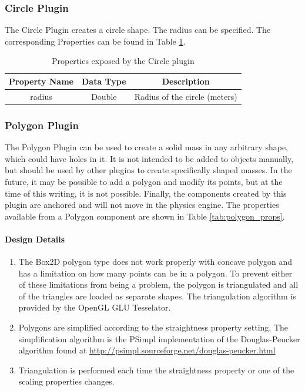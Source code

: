 \begin{itemize}
\subsubsection*{Circle Plugin}
The Circle Plugin creates a circle shape. The radius
can be specified. The corresponding Properties can be found in Table \ref{tab:circle_props}.

\begin{table}[h!]
	\centering
	\caption{Properties exposed by the Circle plugin}
	\label{tab:circle_props}
	\begin{tabular}{c|c|c}
	Property Name & Data Type & Description\\ \hline \hline
	radius & Double & Radius of the circle (meters)
	\end{tabular}
\end{table}

\subsubsection*{Polygon Plugin\label{sec:polygon}}
The Polygon Plugin can be used to create a solid mass in any arbitrary shape, which could have holes in it. It is not intended to be added to objects manually, but should be
used by other plugins to create specifically shaped masses. In the future, it may be possible to add a polygon and modify its points, but at the time of this writing, it is not possible. Finally, the components created by this plugin are anchored and will not move in the physics engine. The properties available from a Polygon component are shown in Table \ref{tab:polygon_props}.

\paragraph{Design Details}
\begin{enumerate}
\item The Box2D polygon type does not work properly with concave polygon and has a limitation on how many points can be in a polygon. To prevent either of these limitations from being a problem, the polygon is triangulated and all of the triangles are loaded as separate shapes. The triangulation algorithm is provided by the OpenGL GLU Tesselator.
\item Polygons are simplified according to the straightness property setting. The simplification algorithm is the PSimpl implementation of the Douglas-Peucker algorithm found at \url{http://psimpl.sourceforge.net/douglas-peucker.html}
\item Triangulation is performed each time the straightness property or one of the scaling properties changes.
\end{enumerate}


\end{itemize}
